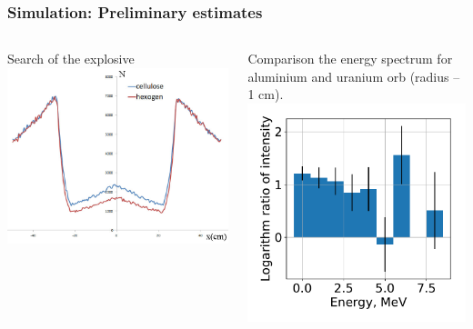 \documentclass[11pt]{beamer}
\begin{document}
\begin{frame}
    \frametitle{Simulation: Preliminary estimates}
    \begin{columns}
        \begin{column}{0.5\textwidth}
            \centering Search of the explosive\\
            \includegraphics[width=1\textwidth]{figures/sim_hexogen.jpeg}
            
        \end{column}
        \begin{column}{0.5\textwidth}
            Comparison the energy spectrum for aluminium and uranium orb (radius -- 1 cm).\\
            \includegraphics[width=1\textwidth]{figures/Difference.pdf}
        \end{column}
    \end{columns}  
\end{frame}
\end{document}
